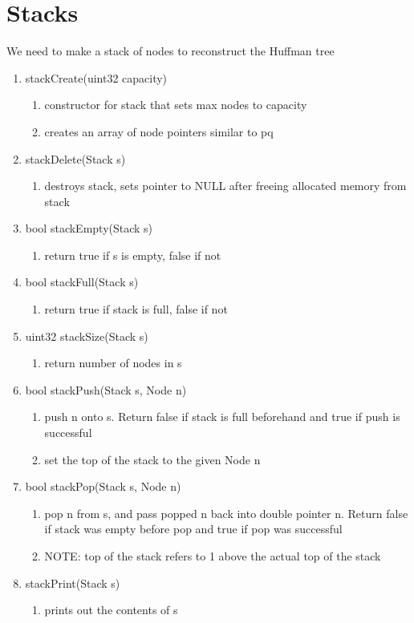 \documentclass[11pt]{article}
\begin{document}
\section{Stacks}\label{ss:stacks}
We need to make a stack of nodes to reconstruct the Huffman tree
\begin{enumerate}
\item stackCreate(uint32 capacity)
	\begin{enumerate}
	\item constructor for stack that sets max nodes to capacity
	\item creates an array of node pointers similar to pq
	\end{enumerate}
\item stackDelete(Stack s)
	\begin{enumerate}
	\item destroys stack, sets pointer to NULL after freeing allocated memory from stack
	\end{enumerate}
\item bool stackEmpty(Stack s)
	\begin{enumerate}
	\item return true if s is empty, false if not
	\end{enumerate}
\item bool stackFull(Stack s)
	\begin{enumerate}
	\item return true if stack is full, false if not
	\end{enumerate}
\item uint32 stackSize(Stack s)
	\begin{enumerate}
	\item return number of nodes in s
	\end{enumerate}
\item bool stackPush(Stack s, Node n)
	\begin{enumerate}
	\item push n onto s. Return false if stack is full beforehand and true if push is successful
	\item set the top of the stack to the given Node n
	\end{enumerate}
\item bool stackPop(Stack s, Node n)
	\begin{enumerate}
	\item pop n from s, and pass popped n back into double pointer n. Return false if stack was empty before pop and true if pop was successful
	\item NOTE: top of the stack refers to 1 above the actual top of the stack
	\end{enumerate}
\item stackPrint(Stack s)
	\begin{enumerate}
	\item prints out the contents of s
	\end{enumerate}
\end{enumerate}
\end{document}
